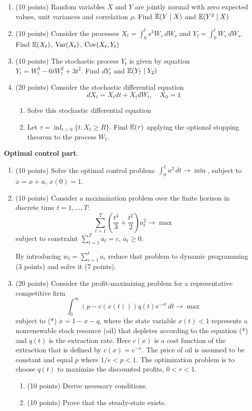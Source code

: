 \documentclass[12pt, a4paper]{article}
\begin{document}
\begin{enumerate}
\item (10 points) Random variables $X$ and $Y$ are jointly normal with zero expected values, unit variances and correlation $\rho$. Find $\mathbb{E}(Y \mid X)$ and $\mathbb{E}(Y^2 \mid X)$
\item (10 points) Consider the processes $X_t=\int_0^t s^3 W_s\,dW_s$ and $Y_t=\int_0^t W_s \, dW_s$. Find $\mathbb{E}(X_t)$, $\operatorname{Var}(X_t)$, $\operatorname{Cov}(X_t,Y_t)$
\item (10 points) The stochastic process $Y_t$ is given by equation $Y_t=W_t^4-6tW_t^2+3t^2$. Find $dY_t$ and $\mathbb{E}(Y_7 \mid Y_2)$
\item (20 points) Consider the stochastic differential equation
\[
dX_t=X_t dt + X_t dW_t, \quad X_0=1
\]
\begin{enumerate}
\item Solve this stochastic differential equation
\item Let $\tau=\inf_{t>0} \{t:X_t\ge R\}$. Find $\mathbb{E}(\tau)$ applying the optional stopping theorem to the process $W_t$.
\end{enumerate}

\end{enumerate}

\vspace{20pt}

\textbf{Optimal control part}.

\vspace{20pt}

\begin{enumerate}[resume]
\item (10 points) Solve the optimal control problem: $\int_0^1 u^2 \, dt \to \min$, subject to $\dot{x}=x+u$, $x(0)=1$. %
\item (10 points) Consider a maximization problem over the finite horizon in discrete time $t=1,\ldots,T$:
\[
\sum_{t=1}^{T} \left(\frac{t^3}{3}+\frac{t^2}{2}\right)a_t^2 \to \max
\]
subject to constraint $\sum_{t=1}^T a_t=c$, $a_t \geq 0$.

By introducing $w_t=\sum_{i=1}^t a_i$  reduce that problem to dynamic programming (3 points) and solve it (7 points).

\item (20 points) Consider the profit-maximizing problem for a representative competitive firm
\[
\int_0^{\infty} (p-c(x(t)))q(t)e^{-rt} \, dt \to \max
\]
subject to (*) $\dot{x}=1-x-q$, where the state variable  $x(t)<1$ represents a nonrenewable stock resource (oil) that depletes according to the equation (*) and $q(t)$ is the extraction rate. Here $c(x)$ is a cost function of the extraction that is defined by $c(x)=e^{-x}$. The price of oil is assumed to be constant and equal $p$ where $1/e<p<1$.  The optimization problem is to choose $q(t)$ to maximize the discounted profits, $0<r<1$.
\begin{enumerate}
\item (10 points) Derive necessary conditions.
\item (10 points) Prove that the steady-state exists.
\end{enumerate}
\end{enumerate}
\end{document}
